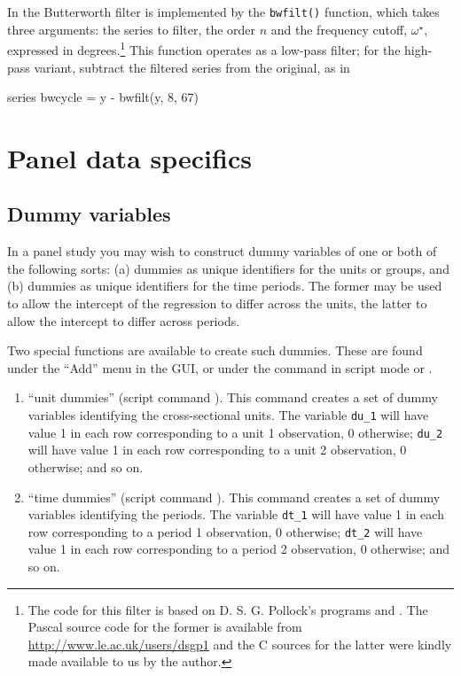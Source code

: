 In  the Butterworth filter is implemented by the
\verb+bwfilt()+ function, which takes three arguments: the series to
filter, the order $n$ and the frequency cutoff, $\omega^{\star}$,
expressed in degrees.\footnote{The code for this filter is based on
  D. S. G. Pollock's programs  and . The
  Pascal source code for the former is available from
  \url{http://www.le.ac.uk/users/dsgp1} and the C sources for the
  latter were kindly made available to us by the author.} This
function operates as a low-pass filter; for the high-pass variant,
subtract the filtered series from the original, as in
%
\begin{code}
series bwcycle = y - bwfilt(y, 8, 67)
\end{code}
      
\section{Panel data specifics}
\label{panel-genr}

\subsection{Dummy variables}
\label{dummies}

In a panel study you may wish to construct dummy variables of one or
both of the following sorts: (a) dummies as unique identifiers for the
units or groups, and (b) dummies as unique identifiers for the time
periods.  The former may be used to allow the intercept of the
regression to differ across the units, the latter to allow the
intercept to differ across periods.

Two special functions are available to create such dummies.  These are
found under the ``Add'' menu in the GUI, or under the 
command in script mode or .

\begin{enumerate}
\item ``unit dummies'' (script command ).  This
  command creates a set of dummy variables identifying the
  cross-sectional units.  The variable \verb+du_1+ will have value 1
  in each row corresponding to a unit 1 observation, 0 otherwise;
  \verb+du_2+ will have value 1 in each row corresponding to a unit 2
  observation, 0 otherwise; and so on.
\item ``time dummies'' (script command ).  This
  command creates a set of dummy variables identifying the periods.
  The variable \verb+dt_1+ will have value 1 in each row
  corresponding to a period 1 observation, 0 otherwise; \verb+dt_2+
  will have value 1 in each row corresponding to a period 2
  observation, 0 otherwise; and so on.
\end{enumerate}


